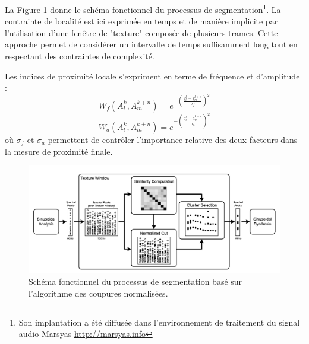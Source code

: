 La Figure \ref{fig:ncut} donne le schéma fonctionnel du processus de segmentation\footnote{Son implantation a été diffusée dans l'environnement de traitement du signal audio Marsyas \url{http://marsyas.info}}. La contrainte de localité est ici exprimée en temps et de manière implicite par l'utilisation d'une fenêtre de "texture" composée de plusieurs trames. Cette approche permet de considérer un intervalle de temps suffisamment long tout en respectant des contraintes de complexité.

Les indices de proximité locale s'expriment en terme de fréquence et d'amplitude :
\begin{equation}
  W_f \left( A _ { l } ^ { k } , A _ { m } ^ { k + n } \right) = e ^ { - \left( \frac { f _ { l } ^ { k } - f _ { m } ^ { k + n } } { \sigma _ { f } } \right) ^ { 2 } }
\end{equation}
\begin{equation}
  W_a \left( A _ { l } ^ { k } , A _ { m } ^ { k + n } \right) =  e ^{ - \left( \frac { a _ { l } ^ { k } - a _ { m } ^ { k + n } } { \sigma _ { a } } \right) ^ { 2 } }
\end{equation}
où $\sigma _ { f }$ et $\sigma _ { a }$ permettent de contrôler l'importance relative des deux facteurs dans la mesure de proximité finale.

\begin{figure}[t]
  \includegraphics[width=1\textwidth]{figures/ncutDiagram.png}
  \caption{Schéma fonctionnel du processus de segmentation basé sur l'algorithme des coupures normalisées.}  \label{fig:ncut}
\end{figure}

